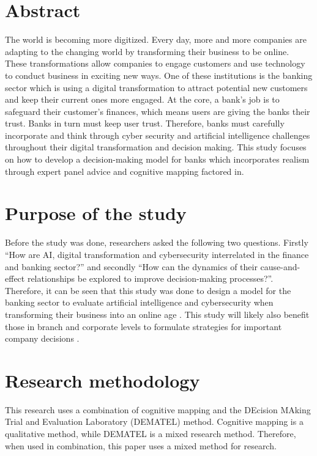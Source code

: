 \documentclass{article}
\begin{document}
\section*{Abstract}
The world is becoming more digitized. Every day, more and more companies are adapting to the changing world by transforming their business to be online. These transformations allow companies to engage customers and use technology to conduct business in exciting new ways. One of these institutions is the banking sector which is using a digital transformation to attract potential new customers and keep their current ones more engaged. At the core, a bank's job is to safeguard their customer’s finances, which means users are giving the banks their trust. Banks in turn must keep user trust. Therefore, banks must carefully incorporate and think through cyber security and artificial intelligence challenges throughout their digital transformation and decision making. This study focuses on how to develop a decision-making model for banks which incorporates realism through expert panel advice and cognitive mapping factored in. \\

\section*{Purpose of the study}
Before the study was done, researchers asked the following two questions. Firstly “How are AI, digital transformation and cybersecurity interrelated in the finance and banking sector?” and secondly “How can the dynamics of their cause-and-effect relationships be explored to improve decision-making processes?”. Therefore, it can be seen that this study was done to design a model for the banking sector to evaluate artificial intelligence and cybersecurity when transforming their business into an online age \cite{SHAIKH20171030}. This study will likely also benefit those in branch and corporate levels to formulate strategies for important company decisions \cite{EDEN2004615}. \\
\section*{Research methodology}
This research uses a combination of cognitive mapping and the DEcision MAking Trial and Evaluation Laboratory (DEMATEL) method. Cognitive mapping is a qualitative method, while DEMATEL is a mixed research method. Therefore, when used in combination, this paper uses a mixed method for research.\\
\end{document}
